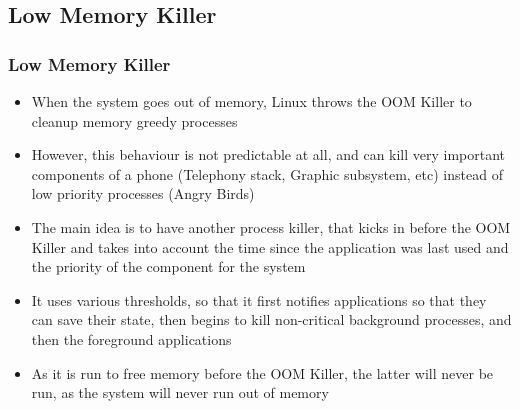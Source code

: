\subsection{Low Memory Killer}
\begin{frame}
  \frametitle{Low Memory Killer}
  \begin{itemize}
  \item When the system goes out of memory, Linux throws the OOM
    Killer to cleanup memory greedy processes
  \item However, this behaviour is not predictable at all, and can
    kill very important components of a phone (Telephony stack,
    Graphic subsystem, etc) instead of low priority processes (Angry Birds)
  \item The main idea is to have another process killer, that kicks in
    before the OOM Killer and takes into account the time since the
    application was last used and the priority of the component
    for the system
  \item It uses various thresholds, so that it first notifies
    applications so that they can save their state, then begins to kill
    non-critical background processes, and then the foreground
    applications
  \item As it is run to free memory before the OOM Killer, the latter
    will never be run, as the system will never run out of memory
  \end{itemize}
\end{frame}
